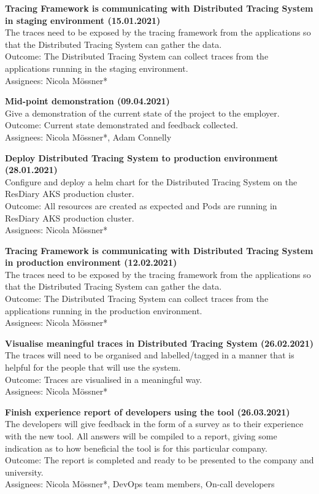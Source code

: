 \documentclass[11pt]{article}
\begin{document}
\textbf{Tracing Framework is communicating with Distributed Tracing System in staging environment (15.01.2021)}\\
The traces need to be exposed by the tracing framework from the applications so that the Distributed Tracing System can gather the data.\\
Outcome: The Distributed Tracing System can collect traces from the applications running in the staging environment.\\
Assignees: Nicola M\"{o}ssner*

\textbf{Mid-point demonstration (09.04.2021)}\\
Give a demonstration of the current state of the project to the employer.\\
Outcome: Current state demonstrated and feedback collected.\\
Assignees: Nicola M\"{o}ssner*, Adam Connelly

\textbf{Deploy Distributed Tracing System to production environment (28.01.2021)}\\
Configure and deploy a helm chart for the Distributed Tracing System on the ResDiary AKS production cluster.\\
Outcome: All resources are created as expected and Pods are running in ResDiary AKS production cluster.\\
Assignees: Nicola M\"{o}ssner*

\textbf{Tracing Framework is communicating with Distributed Tracing System in production environment (12.02.2021)}\\
The traces need to be exposed by the tracing framework from the applications so that the Distributed Tracing System can gather the data.\\
Outcome: The Distributed Tracing System can collect traces from the applications running in the production environment.\\
Assignees: Nicola M\"{o}ssner*

\textbf{Visualise meaningful traces in Distributed Tracing System (26.02.2021)}\\
The traces will need to be organised and labelled/tagged in a manner that is helpful for the people that will use the system.\\
Outcome: Traces are visualised in a meaningful way.\\
Assignees: Nicola M\"{o}ssner*

\textbf{Finish experience report of developers using the tool (26.03.2021)}\\
The developers will give feedback in the form of a survey as to their experience with the new tool. All answers will be compiled to a report, giving some indication as to how beneficial the tool is for this particular company.\\
Outcome: The report is completed and ready to be presented to the company and university.\\
Assignees: Nicola M\"{o}ssner*, DevOps team members, On-call developers
\end{document}
